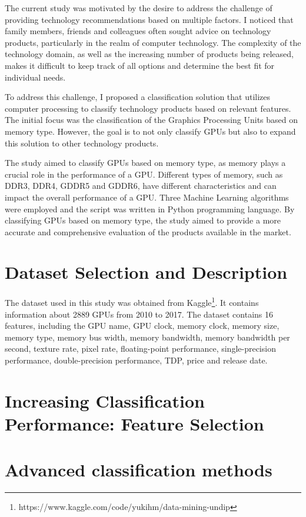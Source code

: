 \documentclass[conference,onecolumn]{IEEEtran}
\begin{document}
The current study was motivated by the desire to address the challenge of providing technology recommendations based on multiple factors. I noticed that family members, friends and colleagues often sought advice on technology products, particularly in the realm of computer technology. The complexity of the technology domain, as well as the increasing number of products being released, makes it difficult to keep track of all options and determine the best fit for individual needs.

To address this challenge, I proposed a classification solution that utilizes computer processing to classify technology products based on relevant features. The initial focus was the classification of the Graphics Processing Units based on memory type. However, the goal is to not only classify GPUs but also to expand this solution to other technology products.

The study aimed to classify GPUs based on memory type, as memory plays a crucial role in the performance of a GPU. Different types of memory, such as DDR3, DDR4, GDDR5 and GDDR6, have different characteristics and can impact the overall performance of a GPU. Three Machine Learning algorithms were employed and the script was written in Python programming language. By classifying GPUs based on memory type, the study aimed to provide a more accurate and comprehensive evaluation of the products available in the market.

\section{Dataset Selection and Description}
The dataset used in this study was obtained from Kaggle\footnote{https://www.kaggle.com/code/yukihm/data-mining-undip}. It contains information about 2889 GPUs from 2010 to 2017. The dataset contains 16 features, including the GPU name, GPU clock, memory clock, memory size, memory type, memory bus width, memory bandwidth, memory bandwidth per second, texture rate, pixel rate, floating-point performance, single-precision performance, double-precision performance, TDP, price and release date.\\


\section{Increasing Classification Performance: Feature Selection}	
\section{Advanced classification methods}
\end{document}
